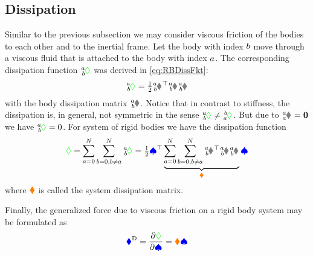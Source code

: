 \subsection{Dissipation}
Similar to the previous subsection we may consider viscous friction of the bodies to each other and to the inertial frame.
Let the body with index $\BidxII$ move through a viscous fluid that is attached to the body with index $\BidxI$.
The corresponding dissipation function $\bodyDissFkt{\BidxI}{\BidxII}$ was derived in \eqref{eq:RBDissFkt}:
\begin{align}
 \bodyDissFkt{\BidxI}{\BidxII} = \tfrac{1}{2} \bodyVel{\BidxI}{\BidxII}^\top \bodyDissMat{\BidxI}{\BidxII} \bodyVel{\BidxI}{\BidxII}
\end{align}
with the body dissipation matrix $\bodyDissMat{\BidxI}{\BidxII}$.
Notice that in contrast to stiffness, the dissipation is, in general, not symmetric in the sense $\bodyDissFkt{\BidxI}{\BidxII} \neq \bodyDissFkt{\BidxII}{\BidxI}$.
But due to $\bodyVel{\BidxI}{\BidxI} = \tuple{0}$ we have $\bodyDissFkt{\BidxI}{\BidxII}=0$.
For system of rigid bodies we have the dissipation function
\begin{align}
 \dissFkt = \sum_{\BidxI=0}^{\numRigidBodies} \sum_{\BidxII=0, \BidxII\neq\BidxI}^{\numRigidBodies} \bodyDissFkt{\BidxI}{\BidxII}
 = \tfrac{1}{2} \sysVel^\top \underbrace{\sum_{\BidxI=0}^{\numRigidBodies} \sum_{\BidxII=0, \BidxII\neq\BidxI}^{\numRigidBodies} \bodyJac{\BidxI}{\BidxII}^\top \bodyDissMat{\BidxI}{\BidxII} \bodyJac{\BidxI}{\BidxII}}_{\sysDissMat} \sysVel
\end{align}
where $\sysDissMat$ is called the system dissipation matrix.

Finally, the generalized force due to viscous friction on a rigid body system may be formulated as
\begin{align}
 \genForceDiss = \pdiff[\dissFkt]{\sysVel} = \sysDissMat \sysVel
\end{align}

